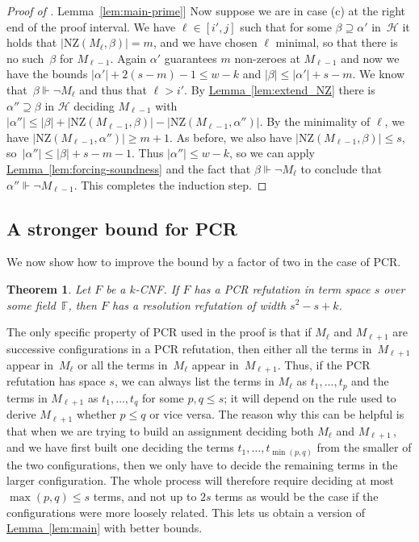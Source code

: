 \documentclass[11pt]{article}
\numberwithin{equation}{section}
\newtheorem{theorem}{Theorem}[section]
\theoremstyle{definition}
\theoremstyle{plain}
\newcommand{\expref}[2]{\hyperref[#2]{#1~\ref{#2}}}
\newcommand\calH{\mathcal{H}}
\newcommand\bbF{\mathbb{F}}
\newcommand\rmNZ{\mathrm{NZ}}
\begin{document}
\begin{proof}[Proof of \expref{Lemma}{lem:main-prime}]
Now suppose we are in case (c) at the right end of the proof interval.
We have  $\ell \in [i',j]$ such that for some $\beta \supseteq \alpha'$ in~$\calH$
it holds that $|\rmNZ(M_{\ell}, \beta)| = m$, 
and we have chosen $\ell$ minimal, so that there is no such~$\beta$ for $M_{\ell-1}$. 
Again $\alpha'$ guarantees $m$ non-zeroes at $M_{\ell-1}$ and now
we have the bounds
$|\alpha'| + 2(s-m)-1 \le w - k$ and $|\beta| \le |\alpha'|+s-m$.
We know that~$\beta \Vdash \neg M_{\ell}$ and thus that $\ell > i'$.
By \expref{Lemma}{lem:extend_NZ} there is $\alpha'' \supseteq \beta$ in $\calH$
deciding $M_{\ell-1}$ with 
$
|\alpha''| \le |\beta|+|\rmNZ(M_{\ell-1},\beta)|-|\rmNZ(M_{\ell-1}, \alpha'')|.
$
By the minimality of $\ell$, we have $|\rmNZ(M_{\ell-1}, \alpha'')| \ge m+1$.
As before, we also have $|\rmNZ(M_{\ell-1}, \beta)| \le s$, 
so~$|\alpha''| \le |\beta|+s-m-1$.
Thus $|\alpha''| \le w-k$, so we can apply \expref{Lemma}{lem:forcing-soundness}
and the fact that $\beta \Vdash \neg M_\ell$ to conclude that $\alpha'' \Vdash \neg M_{\ell-1}$.
This completes the induction step.
\end{proof}



\subsection{A stronger bound for PCR}\label{sec:stronger_PCR}


We now show how to improve the bound 
by a factor of two in the case of PCR.

\begin{theorem}\label{thm:main}
Let $F$ be a $k$-CNF. If $F$ has a PCR refutation in term space $s$ 
over some field~$\bbF$, 
then $F$ has a resolution refutation of width $s^2 - s + k$.
\end{theorem}

The only specific property of PCR used in the proof is that
if $M_\ell$ and $M_{\ell+1}$ are successive configurations in a PCR refutation,
then either all the terms in~$M_{\ell+1}$ appear in~$M_\ell$ or all the terms in~$M_\ell$ appear in~$M_{\ell+1}$.
Thus, if the PCR refutation has space $s$, we can always list the terms 
in $M_\ell$ as $t_1, \dots, t_p$ and the terms in $M_{\ell+1}$ as $t_1, \dots, t_q$ for some $p,q \le s$;
it will depend on the rule used to derive $M_{\ell+1}$ whether $p \le q$ or vice versa.
The reason why this can be helpful is that when we are trying to build an assignment
deciding both $M_\ell$ and $M_{\ell+1}$\,, and we have first built one deciding
the terms $t_1, \dots, t_{\min(p,q)}$ from the smaller of the two configurations, 
then we only have to decide the remaining terms in the larger configuration.
The whole process will therefore require deciding at most $\max(p,q) \le s$ terms,
and not up to $2s$ terms as would be the case if the configurations were more loosely related. 
This lets us obtain a version of \expref{Lemma}{lem:main} with better bounds.
\end{document}
